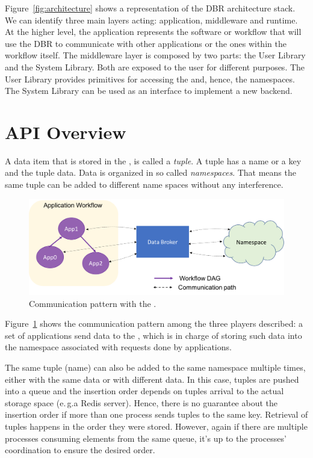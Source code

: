 Figure~\ref{fig:architecture} shows a representation of the DBR
architecture stack.  We can identify three main layers acting:
application, middleware and runtime.  At the higher level, the
application represents the software or workflow that will use the DBR
to communicate with other applications or the ones within the workflow
itself.  The middleware layer is composed by two parts: the User
Library and the System Library.  Both are exposed to the user for
different purposes. The User Library provides primitives for accessing
the \databroker and, hence, the namespaces. The System Library can be
used as an interface to implement a new backend.


\section{\databroker API Overview}

A data item that is stored in the \databroker, is called a \emph{tuple}.
A tuple has a name or a key and the tuple data.
Data is organized in so called \emph{namespaces}. That means the same
tuple can be added to different name spaces without any interference.

\begin{figure}[!htb]
	\centering
	\includegraphics[width=\linewidth]{fig/dbrworkflow}
	\caption{Communication pattern with the \databroker.}
	\label{fig:dbrworkflow}
\end{figure}

Figure~\ref{fig:dbrworkflow} shows the communication pattern among the
three players described: a set of applications send data to the
\databroker, which is in charge of storing such data into the
namespace associated with requests done by applications.


The same tuple (name) can also be added to the same namespace multiple
times, either with the same data or with different data.  In this
case, tuples are pushed into a queue and the insertion order depends
on tuples arrival to the actual storage space (e.\,g.\@ a Redis
server).  Hence, there is no guarantee about the insertion order if
more than one process sends tuples to the same key.  Retrieval of
tuples happens in the order they were stored.  However, again if there
are multiple processes consuming elements from the same queue, it's up
to the processes' coordination to ensure the desired order.




